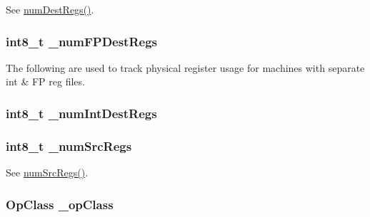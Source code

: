 See \hyperlink{classStaticInst_ab7e23352b3d45a982dfeb799030f87d0}{numDestRegs()}. \hypertarget{classStaticInst_a4ec6cc7bec2115d9e9cf035b5f1a6417}{
\subsubsection[{\_\-numFPDestRegs}]{\setlength{\rightskip}{0pt plus 5cm}int8\_\-t {\bf \_\-numFPDestRegs}}}
\label{classStaticInst_a4ec6cc7bec2115d9e9cf035b5f1a6417}
The following are used to track physical register usage for machines with separate int \& FP reg files. \hypertarget{classStaticInst_a7dd9ab1fe854aac5dfc13be06af528a7}{
\subsubsection[{\_\-numIntDestRegs}]{\setlength{\rightskip}{0pt plus 5cm}int8\_\-t {\bf \_\-numIntDestRegs}}}
\label{classStaticInst_a7dd9ab1fe854aac5dfc13be06af528a7}
\hypertarget{classStaticInst_ad7220cef5373cc7d1be744c59cdb7f81}{
\subsubsection[{\_\-numSrcRegs}]{\setlength{\rightskip}{0pt plus 5cm}int8\_\-t {\bf \_\-numSrcRegs}}}
\label{classStaticInst_ad7220cef5373cc7d1be744c59cdb7f81}


See \hyperlink{classStaticInst_a3902ecc708a6f28e94ee9aa975692915}{numSrcRegs()}. \hypertarget{classStaticInst_a4108a1bc5570a7db48a6ab73d0a636d0}{
\subsubsection[{\_\-opClass}]{\setlength{\rightskip}{0pt plus 5cm}OpClass {\bf \_\-opClass}}}
\label{classStaticInst_a4108a1bc5570a7db48a6ab73d0a636d0}


